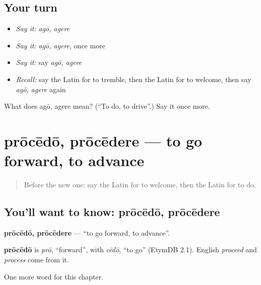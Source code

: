 \subsection*{Your turn}
\begin{itemize}
\raggedright
  \item \emph{Say it:} \emph{agō, agere}
  \item \emph{Say it:} \emph{agō, agere}, once more
  \item \emph{Say it:} say \emph{agō, agere}
  \item \emph{Recall:} say the Latin for to tremble, then the Latin for to welcome, then say \emph{agō, agere} again
\end{itemize}

\begin{tcolorbox}[breakable,colback=teal!4,colframe=teal!35!black,title={Before you move on}]
What does agō, agere mean? (\textquotedblleft{}To do, to drive\textquotedblright{}.) Say it once more.
\end{tcolorbox}
\section[prōcēdō, prōcēdere]{prōcēdō, prōcēdere — to go forward, to advance}

\label{lesson:LA-C202-procedo}



\begin{quote}
Before the new one: say the Latin for to welcome, then the Latin for to do.
\end{quote}

\subsection*{You'll want to know: prōcēdō, prōcēdere}
\textbf{prōcēdō, prōcēdere} — \textquotedblleft{}to go forward, to advance\textquotedblright{}.

\begin{cousinweb}
\textbf{prōcēdō} is \emph{prō}, \textquotedblleft{}forward\textquotedblright{}, with \emph{cēdō}, \textquotedblleft{}to go\textquotedblright{} (EtymDB 2.1). English \emph{proceed} and \emph{process} come from it.
\end{cousinweb}

\begin{grammarlens}[title={What you've built}]
One more word for this chapter.
\end{grammarlens}

